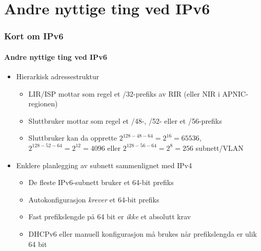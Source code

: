 \section{Andre nyttige ting ved IPv6}
\begin{frame}
  \frametitle{Kort om IPv6}
  \framesubtitle{Andre nyttige ting ved IPv6}
  \begin{itemize}
  \item Hierarkisk adressestruktur
    \begin{itemize}
    \item LIR/ISP mottar som regel et /32-prefiks av RIR (eller NIR i APNIC-regionen)
    \item Sluttbruker mottar som regel et /48-, /52- eller et
      /56-prefiks
    \item Sluttbruker kan da opprette \(2^{128-48-64}=2^{16}=65536\),
      \(2^{128-52-64}=2^{12}=4096\) eller \(2^{128-56-64}=2^8=256\)
      subnett/VLAN
    \end{itemize}
  \item Enklere planlegging av subnett sammenlignet med IPv4
    \begin{itemize}
    \item De fleste IPv6-subnett bruker et 64-bit prefiks
    \item Autokonfigurasjon \textit{krever\/} et 64-bit prefiks
    \item Fast prefikslengde på 64 bit er \textit{ikke\/} et absolutt
      krav
    \item DHCPv6 eller manuell konfigurasjon må brukes når
      prefikslengda er ulik 64 bit
    \end{itemize}
  \end{itemize}
\end{frame}

